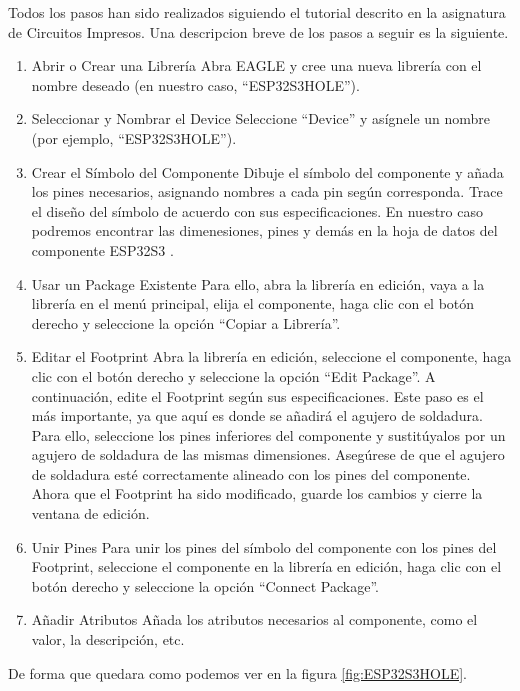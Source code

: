 Todos los pasos han sido realizados siguiendo el tutorial descrito en la asignatura de Circuitos Impresos. Una descripcion breve de los pasos a seguir es la siguiente.

\begin{enumerate}
    \item Abrir o Crear una Librería
    Abra EAGLE y cree una nueva librería con el nombre deseado (en nuestro caso, ``ESP32S3HOLE'').
    \item Seleccionar y Nombrar el Device
    Seleccione ``Device'' y asígnele un nombre (por ejemplo, ``ESP32S3HOLE'').
    \item Crear el Símbolo del Componente
    Dibuje el símbolo del componente y añada los pines necesarios, asignando nombres a cada pin según corresponda. Trace el diseño del símbolo de acuerdo con sus especificaciones. En nuestro caso podremos encontrar las dimenesiones, pines y demás en la hoja de datos del componente ESP32S3 \cite{ESP32S3Datasheet}.
    \item Usar un Package Existente
    Para ello, abra la librería en edición, vaya a la librería en el menú principal, elija el componente, haga clic con el botón derecho y seleccione la opción ``Copiar a Librería''.
    \item Editar el Footprint
    Abra la librería en edición, seleccione el componente, haga clic con el botón derecho y seleccione la opción ``Edit Package''. A continuación, edite el Footprint según sus especificaciones.
    Este paso es el más importante, ya que aquí es donde se añadirá el agujero de soldadura. Para ello, seleccione los pines inferiores del componente y sustitúyalos por un agujero de soldadura de las mismas dimensiones. Asegúrese de que el agujero de soldadura esté correctamente alineado con los pines del componente.
    Ahora que el Footprint ha sido modificado, guarde los cambios y cierre la ventana de edición.
    \item Unir Pines
    Para unir los pines del símbolo del componente con los pines del Footprint, seleccione el componente en la librería en edición, haga clic con el botón derecho y seleccione la opción ``Connect Package''.
    \item Añadir Atributos
    Añada los atributos necesarios al componente, como el valor, la descripción, etc.
\end{enumerate}

De forma que quedara como podemos ver en la figura \ref{fig:ESP32S3HOLE}.

